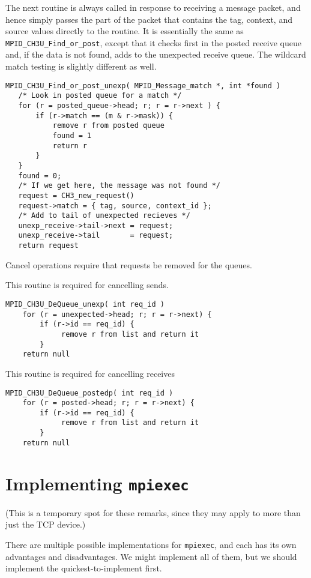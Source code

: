 \documentclass{article}
\def\code{\begingroup\makeustext\eatcode}
\def\eatcode#1{\texttt{#1}\endgroup}
\begin{document}
The next routine is always called in response to receiving a message packet,
and hence simply passes the part of the packet that contains the tag, context,
and source values directly to the routine.  It is essentially the same as 
\code{MPID_CH3U_Find_or_post}, except that it checks first in the posted
receive queue and, if the data is not found, adds to the unexpected receive
queue.  The wildcard match testing is slightly different as well.
\begin{verbatim}
MPID_CH3U_Find_or_post_unexp( MPID_Message_match *, int *found )
   /* Look in posted queue for a match */
   for (r = posted_queue->head; r; r = r->next ) {
       if (r->match == (m & r->mask)) {
           remove r from posted queue
           found = 1
           return r
       }
   }
   found = 0;
   /* If we get here, the message was not found */
   request = CH3_new_request()
   request->match = { tag, source, context_id };
   /* Add to tail of unexpected recieves */
   unexp_receive->tail->next = request;
   unexp_receive->tail       = request;
   return request
\end{verbatim}

Cancel operations require that requests be removed for the queues.

This routine is required for cancelling sends.
\begin{verbatim}
MPID_CH3U_DeQueue_unexp( int req_id )
    for (r = unexpected->head; r; r = r->next) {
        if (r->id == req_id) {
             remove r from list and return it
        }
    return null
\end{verbatim}

This routine is required for cancelling receives
\begin{verbatim}
MPID_CH3U_DeQueue_postedp( int req_id )
    for (r = posted->head; r; r = r->next) {
        if (r->id == req_id) {
             remove r from list and return it
        }
    return null
\end{verbatim}

\section{Implementing \code{mpiexec}}
\label{sec:mpiexec}

(This is a temporary spot for these remarks, since they may apply to more than
just the TCP device.)

There are multiple possible implementations for \code{mpiexec}, and each has
its own advantages and disadvantages.  We might implement all of them, but we
should implement the quickest-to-implement first.
\end{document}
